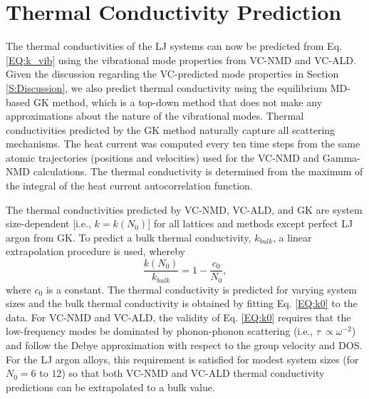 \documentclass[aps,prb,onecolumn,preprint,footinbib,superscriptaddress,amsmath,amssymb,floatfix]{revtex4}
\begin{document}


\section{\label{S:Thermal Conductivity}Thermal Conductivity Prediction}

The thermal conductivities of the LJ systems can now be predicted from 
Eq. \eqref{EQ:k_vib} using the vibrational mode properties 
from VC-NMD and VC-ALD. Given the discussion regarding the 
VC-predicted mode properties in Section \ref{S:Discussion}, 
we also predict thermal conductivity using the equilibrium 
MD-based GK method, which is a top-down method that does not make any 
approximations about the nature of the vibrational modes. 
Thermal conductivities predicted by the GK method 
naturally capture all scattering mechanisms.
\cite{landry_complex_2008,he_thermal_2011,he_lattice_2012} 
The heat current was computed every ten time steps from the same atomic 
trajectories (positions and velocities) used for the VC-NMD and 
Gamma-NMD calculations.  The thermal conductivity is 
determined from the maximum of the integral of the heat 
current autocorrelation function.

The thermal conductivities predicted by VC-NMD, VC-ALD, and GK are system 
size-dependent [i.e., $k = k(N_0)$] for all lattices and methods except 
perfect LJ argon from GK.\cite{mcgaughey_quantitative_2004} 
To predict a bulk thermal conductivity, $k_{bulk}$,  
a linear extrapolation procedure is 
used, whereby 
\begin{equation}\label{EQ:k0}
\frac{k(N_0)}{k_{bulk}} = 1 - \frac{c_0}{N_0},
\end{equation}
where $c_0$ is a constant.\cite{turney_predicting_2009,esfarjani_heat_2011,shiomi_thermal_2011} The thermal conductivity 
is predicted for varying system sizes and the bulk thermal conductivity is 
obtained by fitting Eq. \eqref{EQ:k0} to the data. 
For VC-NMD and VC-ALD, the validity of Eq. \eqref{EQ:k0}  
requires that the low-frequency modes be dominated by 
phonon-phonon scattering (i.e., $\tau\ \propto \omega^{-2}$) and  
follow the Debye approximation 
with respect to the group velocity and DOS.
\cite{shiomi_thermal_2011,esfarjani_heat_2011} For the LJ 
argon alloys, this requirement is satisfied for modest system sizes 
(for $N_0 = 6$ to $12$) so that both VC-NMD and VC-ALD thermal 
conductivity predictions can be extrapolated to a bulk value. 
\end{document}
